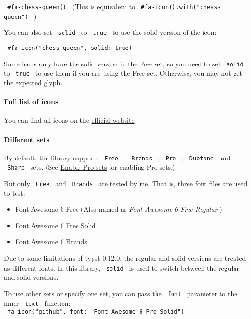 \texttt{\ \#fa-chess-queen()\ } (This is equivalent to
\texttt{\ \#fa-icon().with("chess-queen")\ } )

You can also set \texttt{\ solid\ } to \texttt{\ true\ } to use the
solid version of the icon:

\texttt{\ \#fa-icon("chess-queen",\ solid:\ true)\ }

Some icons only have the solid version in the Free set, so you need to
set \texttt{\ solid\ } to \texttt{\ true\ } to use them if you are using
the Free set. Otherwise, you may not get the expected glyph.

\paragraph{Full list of icons}\label{full-list-of-icons}

You can find all icons on the
\href{https://fontawesome.com/search}{official website}

\paragraph{Different sets}\label{different-sets}

By default, the library supports \texttt{\ Free\ } , \texttt{\ Brands\ }
, \texttt{\ Pro\ } , \texttt{\ Duotone\ } and \texttt{\ Sharp\ } sets.
(See
\href{https://github.com/typst/packages/raw/main/packages/preview/fontawesome/0.5.0/\#enable-pro-sets}{Enable
Pro sets} for enabling Pro sets.)

But only \texttt{\ Free\ } and \texttt{\ Brands\ } are tested by me.
That is, three font files are used to test:

\begin{itemize}
\tightlist
\item
  Font Awesome 6 Free (Also named as \emph{Font Awesome 6 Free Regular}
  )
\item
  Font Awesome 6 Free Solid
\item
  Font Awesome 6 Brands
\end{itemize}

Due to some limitations of typst 0.12.0, the regular and solid versions
are treated as different fonts. In this library, \texttt{\ solid\ } is
used to switch between the regular and solid versions.

To use other sets or specify one set, you can pass the \texttt{\ font\ }
parameter to the inner \texttt{\ text\ } function:\\
\texttt{\ fa-icon("github",\ font:\ "Font\ Awesome\ 6\ Pro\ Solid")\ }

